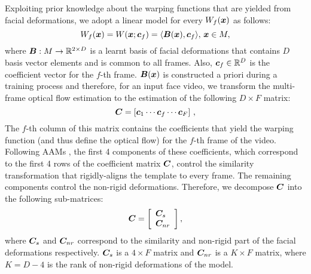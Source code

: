 Exploiting prior knowledge about the warping functions that are yielded from
facial deformations, we adopt a linear model for every $W_f(\boldsymbol{x})$ as follows:
\begin{equation}
    W_f(\boldsymbol{x})=W(\boldsymbol{x};\boldsymbol{c}_f) = \langle \boldsymbol{B}(\boldsymbol{x}) , \boldsymbol{c}_f \rangle, \,\boldsymbol{x} \in M,
\end{equation}
where $\boldsymbol{B}:M\rightarrow \mathbb{R}^{2 \times D}$ is a learnt basis of facial deformations that
contains $D$ basis vector elements and is common to all frames. Also,
$\boldsymbol{c}_f\in\mathbb{R}^D$ is the coefficient vector for the $f$-th frame. $\boldsymbol{B}(\boldsymbol{x})$ is 
constructed a priori during a training process and
therefore, for an input face video, we transform the multi-frame optical flow
estimation to the estimation of the following $D\times F$ matrix:
\begin{equation}
    \boldsymbol{C} = \left[ \boldsymbol{c}_1 \cdots \boldsymbol{c}_f \cdots \boldsymbol{c}_F \right] \,,
\end{equation}
The $f$-th column of this matrix contains the coefficients that yield the
warping function (and thus define the optical flow) for the $f$-th frame of the
video. Following AAMs \cite{RefWorks:95}, the first 4 components of these coefficients, 
which correspond to the first 4 rows of the coefficient matrix $\boldsymbol{C}$, 
control the similarity transformation that rigidly-aligns the template to every 
frame. The remaining components control the non-rigid deformations. 
Therefore, we decompose $\boldsymbol{C}$ into the following sub-matrices:
\begin{equation}\label{E:C_DEC}
    \boldsymbol{C} =
        \left[
            \begin{array}{l}
                \boldsymbol{C}_s\\
                \boldsymbol{C}_{nr} 
            \end{array}
        \right],
\end{equation}
where $\boldsymbol{C}_s$ and $\boldsymbol{C}_{nr}$ correspond to the similarity and non-rigid 
part of the facial deformations respectively. 
$\boldsymbol{C}_s$ is a $4\times F$ matrix and $\boldsymbol{C}_{nr}$ is a $K \times F$ matrix, 
where $K=D-4$ is the rank of non-rigid deformations of the model.
